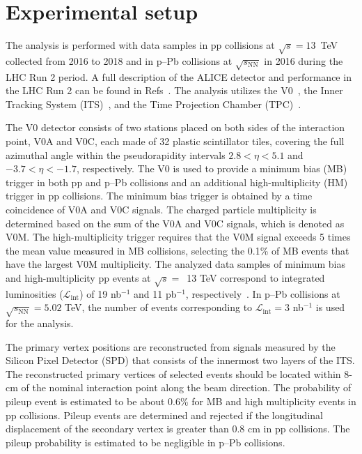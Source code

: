 

\section{Experimental setup}
\label{sec:experiment}

The analysis is performed with data samples in pp collisions at $\sqrt{s} = 13$~TeV collected from 2016 to 2018 and in p--Pb collisions at $\sqrt{s_\mathrm{NN}}$ in 2016 during the LHC Run 2 period. A full description of the ALICE detector and performance in the LHC Run 2 can be found in Refs~\cite{Aamodt:2008zz,Abelev:2014ffa}. The analysis utilizes the V0~\cite{Abbas:2013taa}, the Inner Tracking System (ITS)~\cite{aliceITS}, and the Time Projection Chamber (TPC)~\cite{aliceTPC}. 

The V0 detector consists of two stations placed on both sides of the interaction point, V0A and V0C, each made of 32 plastic scintillator tiles, covering the full azimuthal angle within the pseudorapidity intervals $2.8 < \eta < 5.1$ and $-3.7 < \eta < -1.7$, respectively. The V0 is used to provide a minimum bias (MB) trigger in both pp and p--Pb collisions and an additional high-multiplicity (HM) trigger in pp collisions. The minimum bias trigger is obtained by a time coincidence of V0A and V0C signals. The charged particle multiplicity is determined based on the sum of the V0A and V0C signals, which is denoted as V0M. The high-multiplicity trigger requires that the V0M signal exceeds 5 times the mean value measured in MB collisions, selecting the 0.1\% of MB events that have the largest V0M multiplicity. The analyzed data samples of minimum bias and high-multiplicity pp events at $\sqrt{s}=$~13 TeV correspond to integrated luminosities ($\mathcal{L}_\mathrm{int}$) of 19 nb$^{-1}$ and 11 pb$^{-1}$, respectively~\cite{ALICE-PUBLIC-2016-002}. In p--Pb collisions at $\sqrt{s_\mathrm{NN}} = 5.02$ TeV, the number of events corresponding to $\mathcal{L}_\mathrm{int} = 3$ nb$^{-1}$ is used for the analysis. 

The primary vertex positions are reconstructed from signals measured by the Silicon Pixel Detector (SPD) that consists of the innermost two layers of the ITS. The reconstructed primary vertices of selected events should be located within 8-cm of the nominal interaction point along the beam direction. The probability of pileup event is estimated to be about 0.6\% for MB and high multiplicity events in pp collisions. Pileup events are determined and rejected if the longitudinal displacement of the secondary vertex is greater than 0.8 cm in pp collisions. The pileup probability is estimated to be negligible in p--Pb collisions. 

